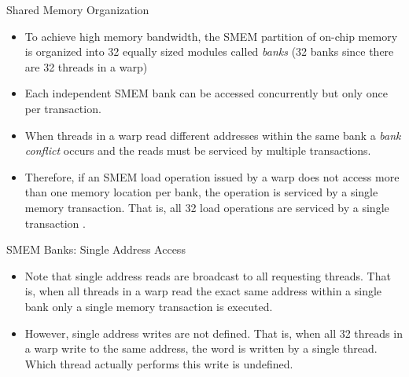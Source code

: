 \documentclass[handout]{beamer}
\begin{document}
\begin{frame}{Shared Memory Organization}
\begin{itemize}
	\item<1->To achieve high memory bandwidth, the SMEM partition of on-chip memory is organized into 32 equally sized modules called \emph{banks} (32 banks since there are 32 threads in a warp)
	\item<1->Each independent SMEM bank can be accessed concurrently but only once per transaction.
	\item<1->When threads in a warp read different addresses within the same bank a \emph{bank conflict} occurs and the reads must be serviced by multiple transactions.
	\item<1->Therefore, if an SMEM load operation issued by a warp does not access more than one memory location per bank, the operation is serviced by a single memory transaction.  That is, all 32 load operations are serviced by a single transaction .  
\end{itemize}
\end{frame}

\begin{frame}{SMEM Banks: Single Address Access}
\begin{itemize}
\itemsep1em
	\item<1->Note that single address reads are broadcast to all requesting threads. That is, when all threads in a warp read the exact same address within a single bank only a single memory transaction is executed.
	\item<1->However, single address writes are not defined.  That is, when all 32 threads in a warp write to the same address, the word is written by a single thread.  Which thread actually performs this write is undefined.  
\end{itemize}
\end{frame}
\end{document}
